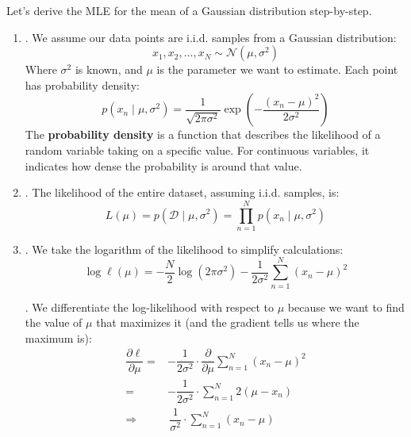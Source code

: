 \highspace
Let's derive the MLE for the mean of a Gaussian distribution step-by-step.
\begin{enumerate}
    \item {}. We assume our data points are i.i.d. samples from a Gaussian distribution:
    \begin{equation*}
        x_1, x_2, \dots, x_N \sim \mathcal{N}(\mu, \sigma^2)
    \end{equation*}
    Where $\sigma^2$ is known, and $\mu$ is the parameter we want to estimate. Each point has probability density:
    \begin{equation*}
        p\left(x_n \mid \mu, \sigma^{2}\right) = \dfrac{1}{\sqrt{2 \pi \sigma^2}} \exp\left(-\dfrac{\left(x_n - \mu\right)^2}{2 \sigma^2}\right)
    \end{equation*}
    The \textbf{probability density} is a function that describes the likelihood of a random variable taking on a specific value. For continuous variables, it indicates how dense the probability is around that value.

    \item {}. The likelihood of the entire dataset, assuming i.i.d. samples, is:
    \begin{equation*}
        L\left(\mu\right) = p\left(\mathcal{D} \mid \mu, \sigma^{2}\right) = \prod_{n=1}^{N} p\left(x_n \mid \mu, \sigma^{2}\right)
    \end{equation*}

    \item {}. We take the logarithm of the likelihood to simplify calculations:
    \begin{equation*}
        \log \ell\left(\mu\right) = -\dfrac{N}{2}\log\left(2 \pi \sigma^{2}\right) - \dfrac{1}{2 \sigma^{2}} \sum_{n=1}^{N} \left(x_n - \mu\right)^2
    \end{equation*}

    . We differentiate the log-likelihood with respect to $\mu$ because we want to find the value of $\mu$ that maximizes it (and the gradient tells us where the maximum is):
    \begin{align*}
        \dfrac{\partial \ell}{\partial \mu} = & -\dfrac{1}{2\sigma^{2}} \cdot \dfrac{\partial}{\partial \mu} \sum_{n=1}^{N} \left(x_n - \mu\right)^{2} \\[.3em]
        = & -\dfrac{1}{2\sigma^{2}} \cdot \sum_{n=1}^{N} 2\left(\mu - x_n\right) \\[.3em]
        \Rightarrow & \, \dfrac{1}{\sigma^{2}} \cdot \displaystyle \sum_{n=1}^{N} \left(x_n - \mu\right)
    \end{align*}


\end{enumerate}
